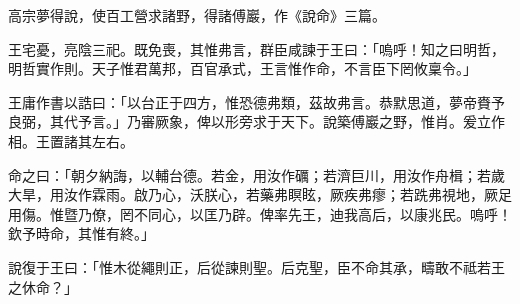 
\begin{pinyinscope}
高宗夢得說，使百工營求諸野，得諸傅巖，作《說命》三篇。

王宅憂，亮陰三祀。既免喪，其惟弗言，群臣咸諫于王曰：「嗚呼！知之曰明哲，明哲實作則。天子惟君萬邦，百官承式，王言惟作命，不言臣下罔攸稟令。」

王庸作書以誥曰：「以台正于四方，惟恐德弗類，茲故弗言。恭默思道，夢帝賚予良弼，其代予言。」乃審厥象，俾以形旁求于天下。說築傅巖之野，惟肖。爰立作相。王置諸其左右。

命之曰：「朝夕納誨，以輔台德。若金，用汝作礪；若濟巨川，用汝作舟楫；若歲大旱，用汝作霖雨。啟乃心，沃朕心，若藥弗瞑眩，厥疾弗瘳；若跣弗視地，厥足用傷。惟暨乃僚，罔不同心，以匡乃辟。俾率先王，迪我高后，以康兆民。嗚呼！欽予時命，其惟有終。」

說復于王曰：「惟木從繩則正，后從諫則聖。后克聖，臣不命其承，疇敢不祗若王之休命？」


\end{pinyinscope}